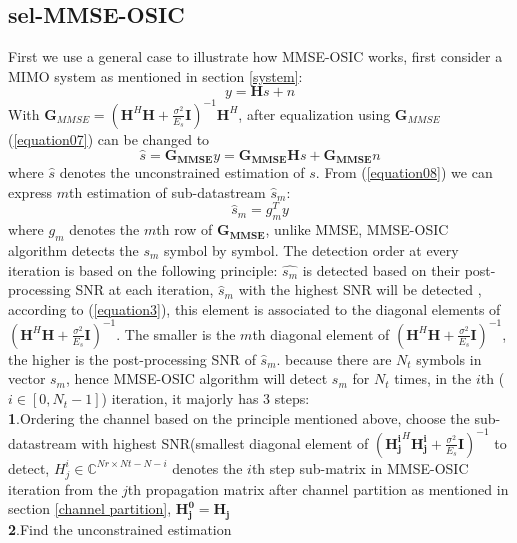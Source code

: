 \documentclass[12pt,a4paper,final]{article}
\begin{document}
\begin{spacing}{2.5}
\subsection{sel-MMSE-OSIC}
First we use a general case to illustrate how MMSE-OSIC works, first consider a MIMO system as mentioned in section \ref{system}:
\begin{equation}
y=\mathbf{H}s+n\label{equation07}
\end{equation}
With $\mathbf{G}_{MMSE}=(\mathbf{H}^{H}\mathbf{H}+\frac{\sigma^{2}}{E_{s}}\mathbf{I})^{-1}\mathbf{H}^{H}$, after equalization using $\mathbf{G}_{MMSE}$ (\ref{equation07}) can be changed to 
\begin{equation}
\hat{s}=\mathbf{G_{MMSE}}y=\mathbf{G_{MMSE}H}s+\mathbf{G_{MMSE}}n\label{equation08}
\end{equation}
where $\hat{s}$ denotes the unconstrained estimation of $s$. From (\ref{equation08}) we can express $m$th estimation of sub-datastream $\hat{s}_{m}$:
\begin{equation}
\hat{s}_{m}={g^{T}_{m}}y\label{equation09}
\end{equation}
where $g_{m}$ denotes the $m$th row of $\mathbf{G_{MMSE}}$, unlike MMSE, MMSE-OSIC algorithm detects the $s_{m}$ symbol by symbol. The detection order at every iteration is based on the following principle: $\hat{s_{m}}$ is detected based on their post-processing SNR at each iteration, $\hat{s}_{m}$ with the highest SNR will be detected , according to (\ref{equation3}), this element is associated to the diagonal elements of $(\mathbf{H}^{H}\mathbf{H}+\frac{\sigma^{2}}{E_{s}}\mathbf{I})^{-1}$. The smaller is the $m$th diagonal element of $(\mathbf{H}^{H}\mathbf{H}+\frac{\sigma^{2}}{E_{s}}\mathbf{I})^{-1}$, the higher is the post-processing SNR of $\hat{s}_{m}$. because there are $N_{t}$ symbols in vector $s_{m}$, hence MMSE-OSIC algorithm will detect $s_{m}$ for $N_{t}$ times, in the $i$th ($i\in [0,N_{t}-1]$) iteration, it majorly has 3 steps:\\
\textbf{1}.Ordering the channel based on the principle mentioned above, choose the sub-datastream with highest SNR(smallest diagonal element of $(\mathbf{H_{j}^{i}}^{H}\mathbf{H_{j}^{i}}+\frac{\sigma^{2}}{E_{s}}\mathbf{I})^{-1}$ to detect, $H_{j}^{i}\in \mathbb{C}^{Nr\times Nt-N-i}$ denotes the $i$th step sub-matrix in MMSE-OSIC iteration from the $j$th propagation matrix after channel partition as mentioned in section \ref{channel partition}, $\mathbf{H_{j}^{0}}=\mathbf{H_{j}}$\\ 
\textbf{2}.Find the unconstrained estimation

\end{spacing}
\end{document}
